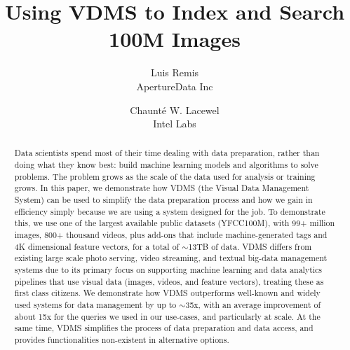 \usepackage{filecontents}




\date{}

\title{\Large \bf Using VDMS to Index and Search 100M Images}

\author{
{\rm Luis Remis}\\
ApertureData Inc
\and
{\rm Chaunt\'e W. Lacewel}\\
Intel Labs
} %

\maketitle

\begin{abstract}
Data scientists spend most of their time dealing with data preparation,
rather than doing what they know best:
build machine learning models and algorithms to solve problems.
The problem grows as the scale of the data used for analysis or training
grows. In this paper, we demonstrate how VDMS (the Visual Data Management System)
can be used to simplify the data preparation process and how we gain
in efficiency simply because we are using a system designed for the job.
To demonstrate this, we use one of the largest available
public datasets (YFCC100M),
with 99+ million images, 800+ thousand videos, plus add-ons that include
machine-generated tags and 4K dimensional feature vectors,
for a total of $\sim$13TB of data.
VDMS differs from existing large scale photo
serving, video streaming, and textual big-data management systems due to
its primary focus on supporting machine learning and
data analytics pipelines that use visual data
(images, videos, and feature vectors), treating these as first class citizens.
We demonstrate how VDMS outperforms well-known and widely used
systems for data management by up to $\sim$35x, with
an average improvement of about 15x for the queries we
used in our use-cases, and particularly at scale.
At the same time, VDMS simplifies the process of data preparation and data access,
and provides functionalities non-existent in alternative options.
\end{abstract}


